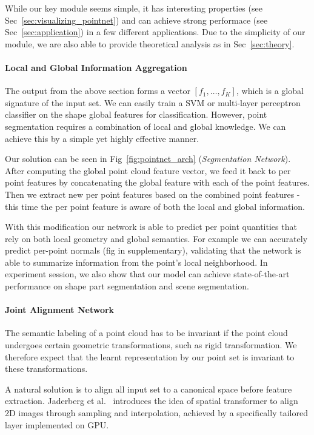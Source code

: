 While our key module seems simple, it has interesting properties (see Sec~\ref{sec:visualizing_pointnet}) and can achieve strong performace (see Sec~\ref{sec:application}) in a few different applications. Due to the simplicity of our module, we are also able to provide theoretical analysis as in Sec~\ref{sec:theory}.


\paragraph{Local and Global Information Aggregation}
The output from the above section forms a vector $[f_1, \dots, f_K]$, which is a global signature of the input set. We can easily train a SVM or multi-layer perceptron classifier on the shape global features for classification. However, point segmentation requires a combination of local and global knowledge. We can achieve this by a simple yet highly effective manner. %

Our solution can be seen in Fig~\ref{fig:pointnet_arch} (\textit{Segmentation Network}). After computing the global point cloud feature vector, we feed it back to per point features by concatenating the global feature with each of the point features. Then we extract new per point features based on the combined point features - this time the per point feature is aware of both the local and global information. %

With this modification our network is able to predict per point quantities that rely on both local geometry and global semantics. For example we can accurately predict per-point normals (fig in supplementary), validating that the network is able to summarize information from the point's local neighborhood. In experiment session, we also show that our model can achieve state-of-the-art performance on shape part segmentation and scene segmentation.
    
\paragraph{Joint Alignment Network}
The semantic labeling of a point cloud has to be invariant if the point cloud undergoes certain geometric transformations, such as rigid transformation. We therefore expect that the learnt representation by our point set is invariant to these transformations. 

A natural solution is to align all input set to a canonical space before feature extraction. Jaderberg et al.~\cite{jaderberg2015spatial} introduces the idea of spatial transformer to align 2D images through sampling and interpolation, achieved by a specifically tailored layer implemented on GPU.

